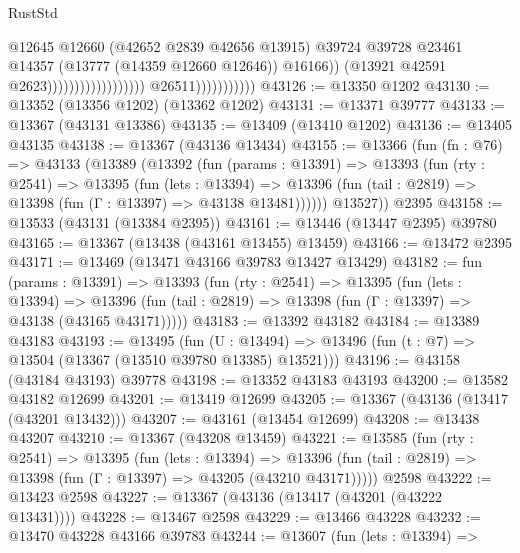 \begin{lexlean}{RustStd}
\begin{coremodule}
                                                                @12645
                                                                @12660
                                                                (@42652 @2839 @42656 @13915)
                                                                @39724
                                                                @39728
                                                                @23461
                                                                @14357
                                                                (@13777 (@14359 @12660 @12646))
                                                                @16166))
                                                            (@13921 @42591 @2623))))))))))))))))))
                          @26511)))))))))))
@43126 := @13350 @1202
@43130 := @13352 (@13356 @1202) (@13362 @1202)
@43131 := @13371 @39777
@43133 := @13367 (@43131 @13386)
@43135 := @13409 (@13410 @1202)
@43136 := @13405 @43135
@43138 := @13367 (@43136 @13434)
@43155 := @13366
    (fun (fn : @76) =>
    @43133
      (@13389
        (@13392
          (fun (params : @13391) =>
          @13393
            (fun (rty : @2541) =>
            @13395
              (fun (lets : @13394) =>
              @13396 (fun (tail : @2819) => @13398 (fun (Γ : @13397) => @43138 @13481))))))
        @13527))
    @2395
@43158 := @13533 (@43131 (@13384 @2395))
@43161 := @13446 (@13447 @2395) @39780
@43165 := @13367 (@13438 (@43161 @13455) @13459)
@43166 := @13472 @2395
@43171 := @13469 (@13471 @43166 @39783 @13427 @13429)
@43182 := fun (params : @13391) =>
  @13393
    (fun (rty : @2541) =>
    @13395
      (fun (lets : @13394) =>
      @13396 (fun (tail : @2819) => @13398 (fun (Γ : @13397) => @43138 (@43165 @43171)))))
@43183 := @13392 @43182
@43184 := @13389 @43183
@43193 := @13495
    (fun (U : @13494) => @13496 (fun (t : @7) => @13504 (@13367 (@13510 @39780 @13385) @13521)))
@43196 := @43158 (@43184 @43193) @39778
@43198 := @13352 @43183 @43193
@43200 := @13582 @43182 @12699
@43201 := @13419 @12699
@43205 := @13367 (@43136 (@13417 (@43201 @13432)))
@43207 := @43161 (@13454 @12699)
@43208 := @13438 @43207
@43210 := @13367 (@43208 @13459)
@43221 := @13585
    (fun (rty : @2541) =>
    @13395
      (fun (lets : @13394) =>
      @13396 (fun (tail : @2819) => @13398 (fun (Γ : @13397) => @43205 (@43210 @43171)))))
    @2598
@43222 := @13423 @2598
@43227 := @13367 (@43136 (@13417 (@43201 (@43222 @13431))))
@43228 := @13467 @2598
@43229 := @13466 @43228
@43232 := @13470 @43228 @43166 @39783
@43244 := @13607
    (fun (lets : @13394) =>

\end{coremodule}
\end{lexlean}

